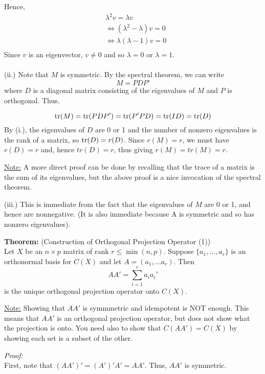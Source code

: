 \documentclass[12pt]{article}
\numberwithin{equation}{section}
\begin{document}
Hence,
\begin{align*}
  & \lambda^2 v = \lambda v \\
  & \iff (\lambda^2 - \lambda) v = 0 \\
  & \iff \lambda (\lambda - 1)v = 0 \\
\end{align*}
Since $v$ is an eigenvector, $v \ne 0$ and so $\lambda = 0$ or $\lambda = 1$. \\
\\
(ii.) Note that $M$ is symmetric. By the spectral theorem, we can write
\begin{equation*}
  M = P D P'
\end{equation*}
where $D$ is a diagonal matrix consisting of the eigenvalues of $M$ and $P$ is orthogonal. Thus,

\begin{equation*}
  \tr(M) = \tr(P D P') = \tr(P' P D) = \tr(I D) = \tr(D)
\end{equation*}
By (i.), the eigenvalues of $D$ are 0 or 1 and the number of nonzero eigenvalues is the rank of a matrix, so $\tr(D) = r(D)$. Since $r(M) = r$, we must have $r(D) = r$ and, hence $tr(D) = r$, thus giving $r(M) = tr(M) = r$.

\underline{Note:} A more direct proof can be done by recalling that the trace of a matrix is the sum of its eigenvalues, but the above proof is a nice invocation of the spectral theorem.

(iii.) This is immediate from the fact that the eigenvalues of $M$ are 0 or 1, and hence are nonnegative. (It is also immediate because A is symmetric and so has nonzero eigenvalues).

\textbf{Theorem:} (Construction of Orthogonal Projection Operator (1)) \\
Let $X$ be an $n \times p$ matrix of rank $r \le \min(n, p)$. Suppose $\{a_1, \ldots, a_r\}$ is an orthonormal basis for $C(X)$ and let
$A = (a_1, \ldots a_r)$. Then
\begin{equation*}
  AA' = \sum_{i = 1}^r a_i a_i'
\end{equation*}
is the unique orthogonal projection operator onto $C(X)$.

\underline{Note:} Showing that $AA'$ is symmmetric and idempotent is NOT enough. This means that $AA'$ is an orthogonal projection operator, but does not show what the projection is onto. You need also to show that $C(AA') = C(X)$ by showing each set is a subset of the other.

\textit{Proof:} \\
First, note that $(AA')' = (A')'A' = AA'$. Thus, $AA'$ is symmetric.
\end{document}
